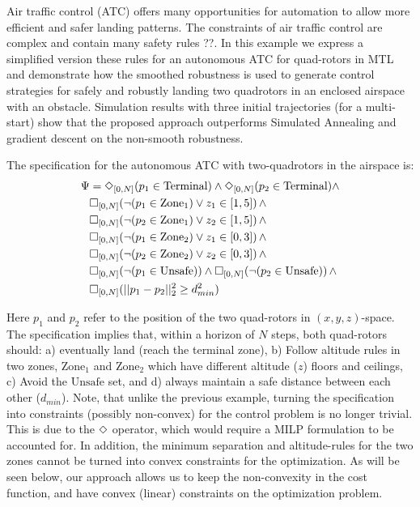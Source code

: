 
Air traffic control (ATC) offers many opportunities for automation to allow more efficient and safer landing patterns. The constraints of air traffic control are complex and contain many safety rules \cite{}??. In this example we express a simplified version these rules for an autonomous ATC for quad-rotors in MTL and demonstrate how the smoothed robustness is used to generate control strategies for safely and robustly landing two quadrotors in an enclosed airspace with an obstacle. Simulation results with three initial trajectories (for a multi-start) show that the proposed approach outperforms Simulated Annealing and gradient descent on the non-smooth robustness.

The specification for the autonomous ATC with two-quadrotors in the airspace is:
{\small
\begin{subequations}
\begin{align}
\Psi &= \Diamond_{[0,N]}(p_1 \in \text{Terminal}) \wedge \Diamond_{[0,N]}(p_2 \in \text{Terminal}) \wedge   \nonumber \\
& \square_{[0,N]} (\neg (p_1 \in \text{Zone}_1) \vee z_1 \in [1,5]) \, \wedge \nonumber \\
& \square_{[0,N]} (\neg (p_2 \in \text{Zone}_1) \vee z_2 \in [1,5]) \, \wedge \nonumber \\
& \square_{[0,N]} (\neg (p_1 \in \text{Zone}_2) \vee z_1 \in [0,3]) \, \wedge \nonumber \\
& \square_{[0,N]} (\neg (p_2 \in \text{Zone}_2) \vee z_2 \in [0,3]) \, \wedge \nonumber \\
& \square_{[0,N]} (\neg (p_1 \in \text{Unsafe})) \wedge \square_{[0,N]} (\neg (p_2 \in \text{Unsafe})) \, \wedge  \nonumber \\
& \square_{[0,N]} (||p_1-p_2||_2^2 \geq d_{min}^2)
\end{align}
\end{subequations}
}

Here $p_1$ and $p_2$ refer to the position of the two quad-rotors in $(x,y,z)$-space. The specification implies that, within a horizon of $N$ steps,  both quad-rotors should: a) eventually land (reach the terminal zone), b) Follow altitude rules in two zones, $\text{Zone}_1$ and $\text{Zone}_2$ which have different altitude ($z$) floors and ceilings, c) Avoid the $\text{Unsafe}$ set, and d) always maintain a safe distance between each other ($d_{min}$). Note, that unlike the previous example, turning the specification into constraints (possibly non-convex) for the control problem is no longer trivial. This is due to the $\Diamond$ operator, which would require a MILP formulation to be accounted for. In addition, the minimum separation and altitude-rules for the two zones cannot be turned into convex constraints for the optimization. As will be seen below, our approach allows us to keep the non-convexity in the cost function, and have convex (linear) constraints on the optimization problem.

